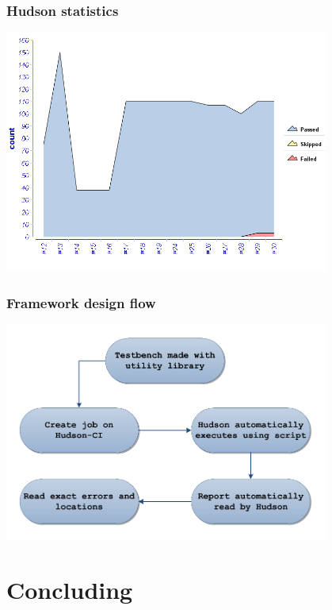 \documentclass[british,10pt]{beamer}
\begin{document}
\begin{frame}\frametitle{Hudson statistics}
\centering
\includegraphics[width=0.8\textwidth]{images/hudsonstats.png}
\end{frame}

\begin{frame}\frametitle{Framework design flow}
\centering
\includegraphics[width=0.8\textwidth]{images/Frameworkflow.pdf}
\end{frame}

\section{Concluding}
\end{document}
